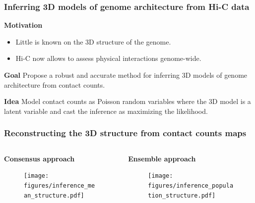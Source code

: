 \documentclass[xcolor=dvipsnames]{beamer}
\begin{document}
\begin{frame}
\frametitle{Inferring 3D models of genome architecture from Hi-C data}
{\color{Blue} \textbf{Motivation}}
\begin{itemize}[label={$\bullet$}]
\item Little is known on the 3D structure of the genome.
\item Hi-C now allows to assess physical interactions genome-wide.
\end{itemize}

\vspace{1em}
{\color{Blue} \textbf{Goal}} Propose a robust and accurate method for
inferring 3D models of genome architecture from contact counts.

\vspace{1em}
{\color{Blue} \textbf{Idea}} Model contact counts as Poisson random variables
where the 3D model is a latent variable and cast the inference as maximizing
the likelihood.

\end{frame}


\begin{frame}
\frametitle{Reconstructing the 3D structure from contact counts maps}
\begin{columns}
\begin{column}{0.5\textwidth}
\begin{center}
{\large \textbf{Consensus approach}}
\end{center}
\begin{figure}
\texttt{[image: figures/inference\_mean\_structure.pdf]}
\end{figure}
{\tiny \citep{duan:three-dimensional, tanizawa:mapping,
bau:three-dimensional, zhang:inference, ben-elazar:spatial,
lesne:3d}}
\end{column}
\begin{column}{0.5\textwidth}
\begin{center}
{\large \textbf{Ensemble approach}}
\end{center}
\begin{figure}
\texttt{[image: figures/inference\_population\_structure.pdf]}
\end{figure}
{\tiny
\citep{rousseau:three, hu:bayesian, kalhor:genome, tjong:physical}}
\end{column}
\end{columns}
\end{frame}
\end{document}
